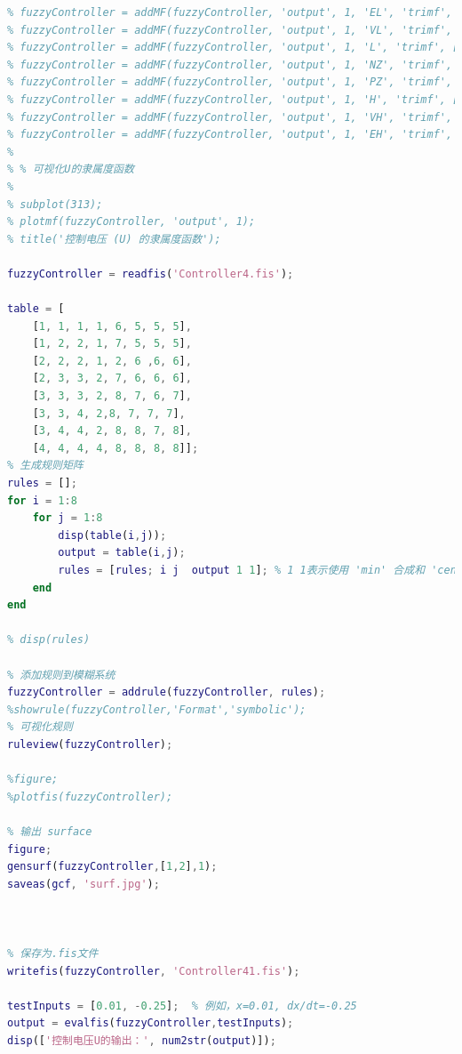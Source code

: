 \documentclass[12pt,a4paper,UTF8]{article}
\begin{document}
\begin{lstlisting}[language=Matlab,caption=fis.m]
% fuzzyController = addvar(fuzzyController, 'output', 'U', [-10 10]);
% fuzzyController = addMF(fuzzyController, 'output', 1, 'EL', 'trimf', [-10 -10 -7]);  % EL: Extremely Low
% fuzzyController = addMF(fuzzyController, 'output', 1, 'VL', 'trimf', [-10 -7 -4]);  % VL: Very Low
% fuzzyController = addMF(fuzzyController, 'output', 1, 'L', 'trimf', [-7 -4 -1]);   % L: Low
% fuzzyController = addMF(fuzzyController, 'output', 1, 'NZ', 'trimf', [-3 -1 1]);  % NZ:negetive ZERO
% fuzzyController = addMF(fuzzyController, 'output', 1, 'PZ', 'trimf', [-1 1 3]);  % M: positive ZERO
% fuzzyController = addMF(fuzzyController, 'output', 1, 'H', 'trimf', [1 4 7]);  % H: High
% fuzzyController = addMF(fuzzyController, 'output', 1, 'VH', 'trimf', [4 7 10]); % VH: Very High
% fuzzyController = addMF(fuzzyController, 'output', 1, 'EH', 'trimf', [7 10 10]); % EH: Extremely High
% 
% % 可视化U的隶属度函数
% 
% subplot(313);
% plotmf(fuzzyController, 'output', 1);
% title('控制电压 (U) 的隶属度函数');

fuzzyController = readfis('Controller4.fis');

table = [
    [1, 1, 1, 1, 6, 5, 5, 5],
    [1, 2, 2, 1, 7, 5, 5, 5],
    [2, 2, 2, 1, 2, 6 ,6, 6],
    [2, 3, 3, 2, 7, 6, 6, 6],
    [3, 3, 3, 2, 8, 7, 6, 7],
    [3, 3, 4, 2,8, 7, 7, 7],
    [3, 4, 4, 2, 8, 8, 7, 8],
    [4, 4, 4, 4, 8, 8, 8, 8]];
% 生成规则矩阵
rules = [];
for i = 1:8
    for j = 1:8
        disp(table(i,j));
        output = table(i,j);
        rules = [rules; i j  output 1 1]; % 1 1表示使用 'min' 合成和 'centroid' 解模糊
    end
end

% disp(rules)

% 添加规则到模糊系统
fuzzyController = addrule(fuzzyController, rules);
%showrule(fuzzyController,'Format','symbolic');
% 可视化规则
ruleview(fuzzyController);

%figure;
%plotfis(fuzzyController);

% 输出 surface
figure;
gensurf(fuzzyController,[1,2],1);
saveas(gcf, 'surf.jpg');



% 保存为.fis文件
writefis(fuzzyController, 'Controller41.fis');

testInputs = [0.01, -0.25];  % 例如，x=0.01, dx/dt=-0.25
output = evalfis(fuzzyController,testInputs);
disp(['控制电压U的输出：', num2str(output)]);
\end{lstlisting}
\end{document}
